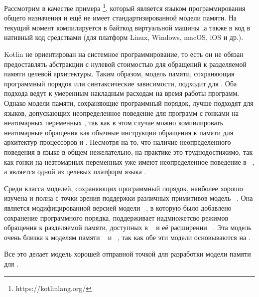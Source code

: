 Рассмотрим в качестве примера \Kotlin\footnote{https://kotlinlang.org/}, который является языком программирования общего назначения и ещё не имеет стандартизированной модели памяти. 
На текущий момент \Kotlin  компилируется  в байткод виртуальной машины \Java,а также  в код \JS в нативный код средствами \LLVM
(для платформ Linux, Windows, macOS, iOS и др.).

Kotlin не ориентирован на системное программирование, 
то есть он не обязан предоставлять абстракции с нулевой стоимостью
для обращений к разделяемой памяти целевой архитектуры. 
Таким образом, модель памяти, сохраняющая программный порядок 
или синтаксические зависимости, подходит для \Kotlin. 
Оба подхода ведут к умеренным накладным расходам 
на время работы программ. 
Однако модели памяти, сохраняющие программный порядок,
лучше подходят для языков, допускающих неопределенное поведение
для программ с гонками на неатомарных переменных \cite{Ou-Demsky:OOPSLA18}, 
так как в этом случае можно компилировать неатомарные обращения
как обычные инструкции обращения к памяти для архитектур процессоров \ARM и \POWER.
Несмотря на то, что наличие неопределенного поведения в языке 
\Kotlin в общем нежелательно, на практике это труднодостижимо, 
так как гонки на неатомарных переменных уже имеют 
неопределенное поведение в \LLVM~\cite{Chakraborty-Vafeiadis:CGO17},
а \LLVM является одной из целевых платформ языка \Kotlin.

Среди класса моделей, сохраняющих программный порядок, наиболее 
хорошо изучена и полна с точки зрения поддержки 
различных примитивов  модель \RCMM~\cite{Lahav-al:PLDI17}. Она  
является  модифицированной версией модели \CMM~\cite{Batty-al:POPL11}, 
в которую было добавлено сохранение программного порядка.
\RCMM поддерживает надмножетсво режимов обращения к разделяемой памяти, 
доступных в \JMM~\cite{Manson-al:POPL05} и её расширении \JAM~\cite{Bender-Palsberg:OOPSLA19}. 
Эта модель очень близка к моделям памяти 
\JS~\cite{Watt-al:PLDI2020} и \LLVM~\cite{Chakraborty-Vafeiadis:CGO17}, 
так как обе эти модели основываются на  \CMM.

Все это делает модель \RCMM хорошей отправной точкой для разработки модели памяти для \Kotlin.